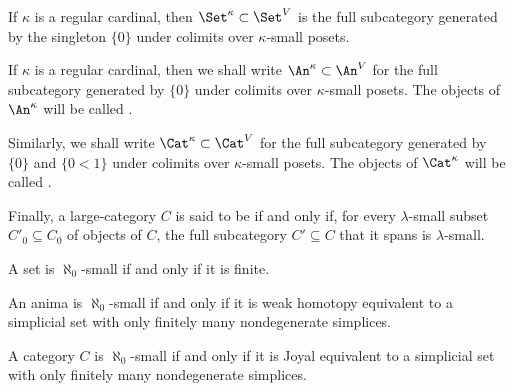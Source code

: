 \begin{nul}
	If $ \kappa $ is a regular cardinal,
	then $ \Set^{\kappa} \subset \Set^V $ is the full subcategory
	generated by the singleton $ \{ 0 \}$
	under colimits over $ \kappa $-small posets.
\end{nul}

\begin{definition}
	If $ \kappa $ is a regular cardinal,
	then we shall write $ \An^{\kappa} \subset \An^V $
	for the full subcategory generated by $ \{ 0 \} $
	under colimits over $ \kappa $-small posets.
	The objects of $ \An^{\kappa} $ will be called
	.

	Similarly, we shall write $ \Cat^{\kappa} \subset \Cat^V $
	for the full subcategory generated 
	by $ \{ 0 \} $ and $ \{ 0 < 1 \} $
	under colimits over $ \kappa $-small posets.
	The objects of $ \Cat^{\kappa} $ will be called
	.

	Finally, a large-category $ C $
	is said to be 
	if and only if,
	for every $ \lambda $-small subset $ C'_0 \subseteq C_0 $
	of objects of $ C $, the full subcategory $ C' \subseteq C $
	that it spans is $ \lambda $-small.
\end{definition}

\begin{eg}
	A set is $ \aleph_0 $-small if and only if it is finite.

	An anima is $ \aleph_0 $-small if and only if
	it is weak homotopy equivalent to a simplicial set
	with only finitely many nondegenerate simplices.

	A category $ C $ is $ \aleph_0 $-small if and only if
	it is Joyal equivalent to a simplicial set
	with only finitely many nondegenerate simplices. 
\end{eg}

